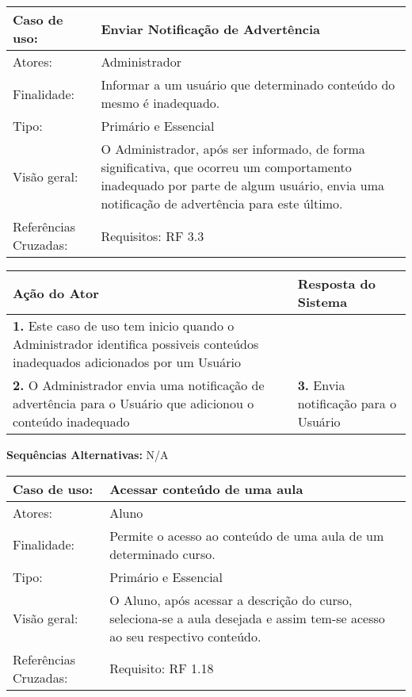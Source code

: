 \documentclass[12pt,a4paper,onecolumn,titlepage]{article}
\begin{document}
\begin{table}[h!]
\begin{center}
\begin{tabular}{p{2.5cm} p{9.5cm}}
Caso de uso: & \textbf{Enviar Notificação de Advertência} \\ \hline
Atores: & Administrador \\ \hline
Finalidade: & Informar a um usuário que determinado conteúdo do mesmo é inadequado.\\ \hline
Tipo: & Primário e Essencial \\ \hline
Visão geral: & O Administrador, após ser informado, de forma significativa, que ocorreu um comportamento inadequado por parte de algum usuário, envia uma notificação de advertência para este último. \\ \hline
Referências Cruzadas: & Requisitos: RF 3.3\\ 

\end{tabular}
\end{center}
\end{table}

\begin{center}
\def\arraystretch{1.1}
\begin{tabular}{|p{6cm}|p{6cm}|}

\hline
\textbf{Ação do Ator} & \textbf{Resposta do Sistema} \\ \hline
\textbf{1.} Este caso de uso tem inicio quando o Administrador identifica possiveis conteúdos inadequados adicionados por um Usuário  & \\ \hline
\textbf{2.} O Administrador envia uma notificação de advertência para o Usuário que adicionou o conteúdo inadequado  & \textbf{3.} Envia notificação para o Usuário \\ \hline
\end{tabular}
\end{center}

\textbf{Sequências Alternativas:} N/A

\newpage

\begin{table}[h!]
\begin{center}
\begin{tabular}{p{2.5cm} p{9.5cm}}
Caso de uso: & \textbf{Acessar conteúdo de uma aula} \\ \hline
Atores: & Aluno \\ \hline
Finalidade: & Permite o acesso ao conteúdo de uma aula de um determinado curso. \\ \hline
Tipo: & Primário e Essencial\\ \hline
Visão geral: & O Aluno, após acessar a descrição do curso, seleciona-se a aula desejada e assim tem-se acesso ao seu respectivo conteúdo. \\ \hline
Referências Cruzadas: & Requisito: RF 1.18 

\end{tabular}
\end{center}
\end{table}
\end{document}
